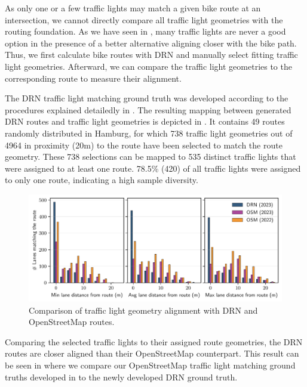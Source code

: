 As only one or a few traffic lights may match a given bike route at an intersection, we cannot directly compare all traffic light geometries with the routing foundation. As we have seen in , many traffic lights are never a good option in the presence of a better alternative aligning closer with the bike path. Thus, we first calculate bike routes with DRN and manually select fitting traffic light geometries. Afterward, we can compare the traffic light geometries to the corresponding route to measure their alignment. 

The DRN traffic light matching ground truth was developed according to the procedures explained detailedly in . The resulting mapping between generated DRN routes and traffic light geometries is depicted in . It contains 49 routes randomly distributed in Hamburg, for which 738 traffic light geometries out of 4964 in proximity (20m) to the route have been selected to match the route geometry. These 738 selections can be mapped to 535 distinct traffic lights that were assigned to at least one route. 78.5\% (420) of all traffic lights were assigned to only one route, indicating a high sample diversity.

\begin{figure}[t]
\centering 
\includegraphics[width=\linewidth]{images/routing-lane-alignment.pdf}
\caption{Comparison of traffic light geometry alignment with DRN and OpenStreetMap routes.}
\label{fig:routing-lane-alignment}
\end{figure}

Comparing the selected traffic lights to their assigned route geometries, the DRN routes are closer aligned than their OpenStreetMap counterpart. This result can be seen in  where we compare our OpenStreetMap traffic light matching ground truths developed in  to the newly developed DRN ground truth. 

